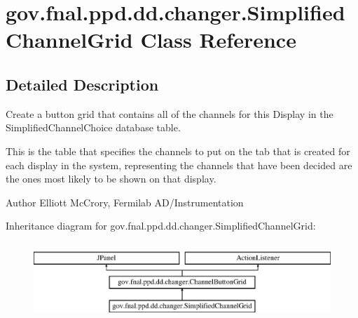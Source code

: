 \hypertarget{classgov_1_1fnal_1_1ppd_1_1dd_1_1changer_1_1SimplifiedChannelGrid}{\section{gov.\-fnal.\-ppd.\-dd.\-changer.\-Simplified\-Channel\-Grid Class Reference}
\label{classgov_1_1fnal_1_1ppd_1_1dd_1_1changer_1_1SimplifiedChannelGrid}
}


\subsection{Detailed Description}
Create a button grid that contains all of the channels for this Display in the Simplified\-Channel\-Choice database table.

This is the table that specifies the channels to put on the tab that is created for each display in the system, representing the channels that have been decided are the ones most likely to be shown on that display.

\begin{DoxyAuthor}{Author}
Elliott Mc\-Crory, Fermilab A\-D/\-Instrumentation 
\end{DoxyAuthor}
Inheritance diagram for gov.\-fnal.\-ppd.\-dd.\-changer.\-Simplified\-Channel\-Grid\-:\begin{figure}[H]
\begin{center}
\leavevmode
\includegraphics[height=2.906574cm]{classgov_1_1fnal_1_1ppd_1_1dd_1_1changer_1_1SimplifiedChannelGrid}
\end{center}
\end{figure}
